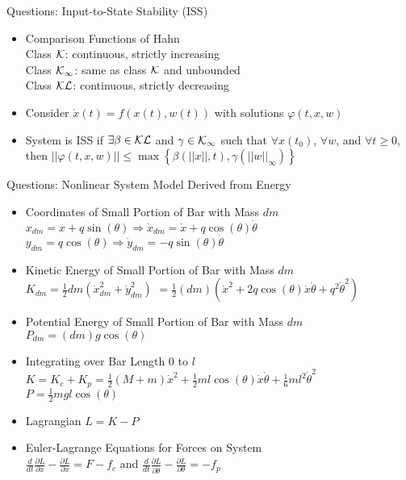 \documentclass{beamer}
\begin{document}
\begin{frame}{Questions: Input-to-State Stability (ISS)}
\begin{itemize}
\pause \item Comparison Functions of Hahn\\
Class ${\cal K}$: continuous, strictly increasing\\
Class ${\cal K}_\infty$: same as class ${\cal K}$ and unbounded\\
Class ${\cal KL}$: continuous, strictly decreasing
\pause \item Consider $\dot{x}\left(t\right)=f\left(x\left(t\right),w\left(t\right)\right)$ with solutions $\varphi\left(t,x,w\right)$
\pause \item System is ISS if $\exists\beta\in{\cal KL}$ and $\gamma\in{\cal K}_\infty$ such that $\forall x\left(t_0\right)$, $\forall w$, and $\forall t\geq0$, then $||\varphi\left(t,x,w\right)||\leq\max\left\{\beta\left(||x||,t\right),\gamma\left(||w||_\infty\right)\right\}$
\end{itemize}
\end{frame}

\begin{frame}{Questions: Nonlinear System Model Derived from Energy}

\begin{itemize}
\item Coordinates of Small Portion of Bar with Mass $dm$\\
$x_{dm}=x+q\sin\left(\theta\right)\Rightarrow\dot{x}_{dm}=\dot{x}+q\cos\left(\theta\right)\dot{\theta}$\\$y_{dm}=q\cos\left(\theta\right)\Rightarrow\dot{y}_{dm}=-q\sin\left(\theta\right)\dot{\theta}$
\pause \item Kinetic Energy of Small Portion of Bar with Mass $dm$\\$K_{dm}=\frac{1}{2}dm\left(\dot{x}_{dm}^2+\dot{y}_{dm}^2\right)$ \pause $=\frac{1}{2}\left(dm\right)\left(\dot{x}^2+2q\cos\left(\theta\right)\dot{x}\dot{\theta}+q^2\dot{\theta}^2\right)$
\pause \item Potential Energy of Small Portion of Bar with Mass $dm$\\$P_{dm}=\left(dm\right)g\cos\left(\theta\right)$
\pause \item Integrating over Bar Length $0$ to $l$\\
$K=K_c+K_p=\frac{1}{2}\left(M+m\right)\dot{x}^2+\frac{1}{2}ml\cos\left(\theta\right)\dot{x}\dot{\theta}+\frac{1}{6}ml^2\dot{\theta}^2$\\
$P=\frac{1}{2}mgl\cos\left(\theta\right)$
\pause \item Lagrangian $L=K-P$
\pause \item Euler-Lagrange Equations for Forces on System\\
$\frac{d}{dt}\frac{\partial L}{\partial\dot{x}}-\frac{\partial L}{\partial x}=F-f_c$ and $\frac{d}{dt}\frac{\partial L}{\partial\dot{\theta}}-\frac{\partial L}{\partial \theta}=-f_p$
\end{itemize}

\end{frame}
\end{document}
